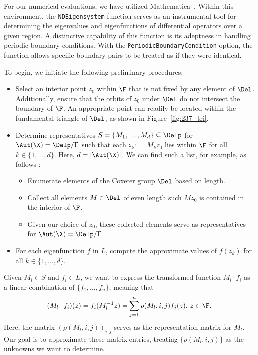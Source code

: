 For our numerical evaluations, we have utilized Mathematica~\cite{Mathematica}.
Within this environment, the \texttt{NDEigensystem} function serves as an instrumental tool for determining the eigenvalues and eigenfunctions of differential operators over a given region.
A distinctive capability of this function is its adeptness in handling periodic boundary conditions.
With the \texttt{PeriodicBoundaryCondition} option, the function allows specific boundary pairs to be treated as if they were identical.

To begin, we initiate the following preliminary procedures:
\begin{itemize}
    \item Select an interior point \(z_0\) within \(\F\) that is not fixed by any element of \(\Del\). Additionally, ensure that the orbits of \(z_0\) under \(\Del\) do not intersect the boundary of \(\F\). 
    An appropriate point can readily be located within the fundamental triangle of \(\Del\), as shown in Figure~\ref{fig:237_tri}.
    \item Determine representatives \(S=\{M_1,\dots, M_d\}\subseteq \Delp\) for 
    \(\Aut(\X) = \Delp/\Gamma\)
    such that each \(z_k : = M_k z_0\) lies within \(\F\) for all $k\in \{1,\dots, d\}$. Here, $d=|\Aut(\X)|$. 
    We can find such a list, for example, as follows :
    \begin{itemize}
        \item Enumerate elements of the Coxeter group \(\Del\) based on length.
        \item Collect all elements \(M\in \Del\) of even length such \(M z_0\) is contained in the interior of \(\F\).
        \item Given our choice of \(z_0\), these collected elements serve as representatives for \(\Aut(\X) = \Delp/\Gamma\).
    \end{itemize}
    \item For each eigenfunction \(f\) in \(L\), compute the approximate values of \(f(z_k)\) for all \(k\in \{1,\dots, d\}\).
\end{itemize}

Given $M_l\in S$ and $f_i \in L$,  we want to express the transformed function $M_l\cdot f_i$ as a linear combination of $\{f_1,\dots, f_n\}$, meaning that
\[    
(M_l\cdot f_i)(z) = f_i(M_l^{-1}z) = \sum_{j=1}^n \rho(M_l,i,j)f_j(z),\, z\in \F.
\]    
Here, the matrix $\left(\rho(M_l,i,j)\right)_{i,j}$ serves as the representation matrix for $M_l$.
Our goal is to approximate these matrix entries, treating $\{\rho(M_l,i,j)\}$ as the unknowns we want to determine.

